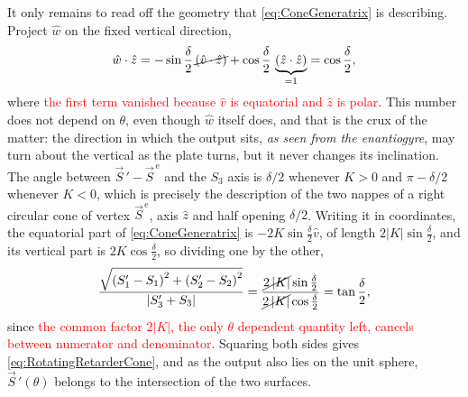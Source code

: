             It only remains to read off the geometry that \ref{eq:ConeGeneratrix} is describing. Project $\hat{w}$ on the fixed vertical direction,
            \begin{equation*}
                \hat{w}\cdot\hat{z} = -\sin\frac{\delta}{2}\,\cancel{\left(\hat{v}\cdot\hat{z}\right)}+\cos\frac{\delta}{2}\,\underbrace{\left(\hat{z}\cdot\hat{z}\right)}_{=1} = \cos\frac{\delta}{2},
            \end{equation*}
            where \textcolor{red}{the first term vanished because $\hat{v}$ is equatorial and $\hat{z}$ is polar}. This number does not depend on $\theta$, even though $\hat{w}$ itself does, and that is the crux of the matter: the direction in which the output sits, \textit{as seen from the enantiogyre}, may turn about the vertical as the plate turns, but it never changes its inclination. The angle between $\vec{S}\,'-\vec{S}^{\,\text{e}}$ and the $S_3$ axis is $\delta/2$ whenever $K>0$ and $\pi-\delta/2$ whenever $K<0$, which is precisely the description of the two nappes of a right circular cone of vertex $\vec{S}^{\,\text{e}}$, axis $\hat{z}$ and half opening $\delta/2$. Writing it in coordinates, the equatorial part of \ref{eq:ConeGeneratrix} is $-2K\sin\frac{\delta}{2}\hat{v}$, of length $2\left|K\right|\sin\frac{\delta}{2}$, and its vertical part is $2K\cos\frac{\delta}{2}$, so dividing one by the other,
            \begin{equation*}
                \frac{\sqrt{\left(S'_1-S_1\right)^2+\left(S'_2-S_2\right)^2}}{\left|S'_3+S_3\right|} = \frac{\cancel{2\left|K\right|}\sin\frac{\delta}{2}}{\cancel{2\left|K\right|}\cos\frac{\delta}{2}} = \tan\frac{\delta}{2},
            \end{equation*}
            since \textcolor{red}{the common factor $2\left|K\right|$, the only $\theta$ dependent quantity left, cancels between numerator and denominator}. Squaring both sides gives \ref{eq:RotatingRetarderCone}, and as the output also lies on the unit sphere, $\vec{S}\,'(\theta)$ belongs to the intersection of the two surfaces.

